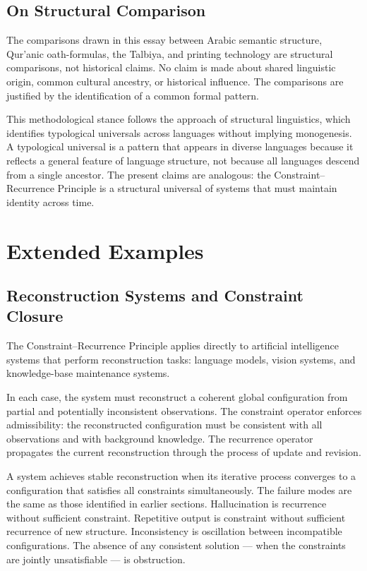\documentclass[12pt, oneside]{article}
\theoremstyle{definition}
\theoremstyle{remark}
\begin{document}
\subsection{On Structural Comparison}

The comparisons drawn in this essay between Arabic semantic structure, Qur'anic oath-formulas, the Talbiya, and printing technology are structural comparisons, not historical claims.
No claim is made about shared linguistic origin, common cultural ancestry, or historical influence.
The comparisons are justified by the identification of a common formal pattern.

This methodological stance follows the approach of structural linguistics, which identifies typological universals across languages without implying monogenesis.
A typological universal is a pattern that appears in diverse languages because it reflects a general feature of language structure, not because all languages descend from a single ancestor.
The present claims are analogous: the Constraint--Recurrence Principle is a structural universal of systems that must maintain identity across time.

\section{Extended Examples}

\subsection{Reconstruction Systems and Constraint Closure}

The Constraint--Recurrence Principle applies directly to artificial intelligence systems that perform reconstruction tasks: language models, vision systems, and knowledge-base maintenance systems.

In each case, the system must reconstruct a coherent global configuration from partial and potentially inconsistent observations.
The constraint operator enforces admissibility: the reconstructed configuration must be consistent with all observations and with background knowledge.
The recurrence operator propagates the current reconstruction through the process of update and revision.

A system achieves stable reconstruction when its iterative process converges to a configuration that satisfies all constraints simultaneously.
The failure modes are the same as those identified in earlier sections.
Hallucination is recurrence without sufficient constraint.
Repetitive output is constraint without sufficient recurrence of new structure.
Inconsistency is oscillation between incompatible configurations.
The absence of any consistent solution --- when the constraints are jointly unsatisfiable --- is obstruction.
\end{document}
